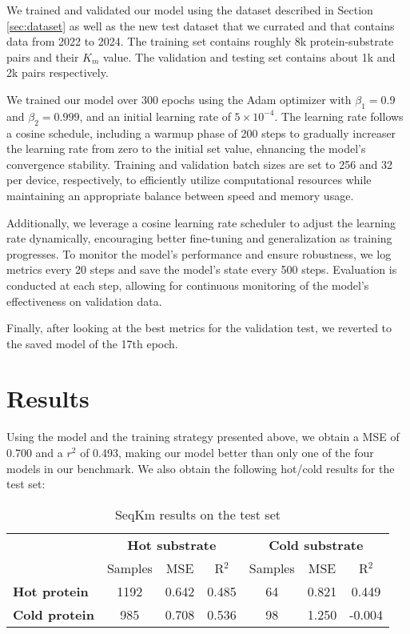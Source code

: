 We trained and validated our model using the dataset described in Section \ref{sec:dataset} as well as the new
test dataset that we currated and that contains data from 2022 to 2024. The training set contains roughly 8k
protein-substrate pairs and their $K_m$ value. The validation and testing set contains about 1k and 2k pairs
respectively. 

We trained our model over 300 epochs using the Adam optimizer with $\beta_1=0.9$ and $\beta_2=0.999$, and an initial
learning rate of $5\times10^{-4}$. The learning rate follows a cosine schedule, including a warmup phase of 200
steps to gradually increaser the learning rate from zero to the initial set value, ehnancing the model's convergence
stability. Training and validation batch sizes are set to 256 and 32 per device, respectively, to efficiently
utilize computational resources while maintaining an appropriate balance between speed and memory usage. 

Additionally, we leverage a cosine learning rate scheduler to adjust the learning rate dynamically, 
encouraging better fine-tuning and generalization as training progresses. To monitor the model's performance 
and ensure robustness, we log metrics every 20 steps and save the model's state every 500 steps. 
Evaluation is conducted at each step, allowing for continuous monitoring of the model's effectiveness on 
validation data. 

Finally, after looking at the best metrics for the validation test, we reverted to the saved model of the
 17th epoch. 

 \section{Results}

 Using the model and the training strategy presented above, we obtain a MSE of 0.700 and a $r^2$ of 0.493, making our model better than only one of the four models in our benchmark. We also obtain the following hot/cold results for the test set:

 \begin{table}[ht]
  \centering
  \begin{tabular}{lcccccc}
  \hline
   & \multicolumn{3}{c}{\textbf{Hot substrate}} & \multicolumn{3}{c}{\textbf{Cold substrate}} \\
   & Samples & MSE & R\(^2\) & Samples & MSE & R\(^2\) \\ \hline
  \textbf{Hot protein}  & 1192 & 0.642 & 0.485 & 64 & 0.821 & 0.449 \\
  \textbf{Cold protein} & 985 & 0.708 & 0.536 & 98 & 1.250 & -0.004 \\ \hline
  \end{tabular}
  \caption{SeqKm results on the test set}
  \label{tab:seqkm_results}
 \end{table}

